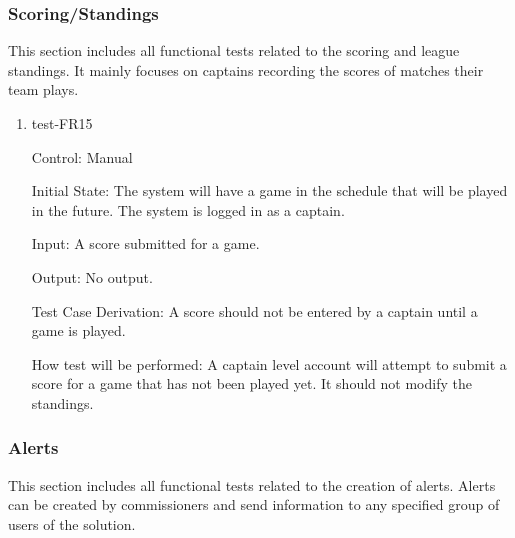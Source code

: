 \documentclass[12pt, titlepage]{article}
\begin{document}
\subsubsection{Scoring/Standings}

This section includes all functional tests related to the scoring and
league standings. It mainly focuses on captains recording the scores of
matches their team plays.

\begin{enumerate}

  \item{test-FR15\\}

  Control: Manual

  Initial State: The system will have a game in the schedule that will be played
  in the future. The system is logged in as a captain.
            
  Input: A score submitted for a game.

  Output: No output.

  Test Case Derivation: A score should not be entered by a captain until a game
  is played.

  How test will be performed: A captain level account will attempt to submit a
  score for a game that has not been played yet. It should not modify the
  standings.

\end{enumerate}

\subsubsection{Alerts}

This section includes all functional tests related to the creation of alerts.
Alerts can be created by commissioners and send information to any specified
group of users of the solution.
\end{document}
